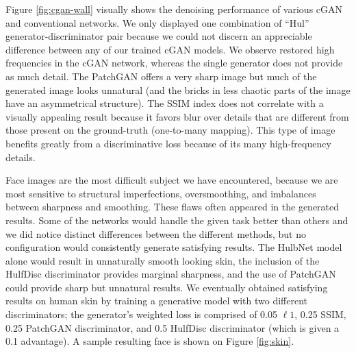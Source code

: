 Figure \ref{fig:cgan-wall} visually shows the denoising performance of various \ac{cGAN} and conventional networks. We only displayed one combination of ``Hul'' generator-discriminator pair because we could not discern an appreciable difference between any of our trained \ac{cGAN} models. We observe restored high frequencies in the \ac{cGAN} network, whereas the single generator does not provide as much detail. The PatchGAN offers a very sharp image but much of the generated image looks unnatural (and the bricks in less chaotic parts of the image have an asymmetrical structure). The SSIM index does not correlate with a visually appealing result because it favors blur over details that are different from those present on the ground-truth (one-to-many mapping). This type of image benefits greatly from a discriminative loss because of its many high-frequency details.

Face images are the most difficult subject we have encountered, because we are most sensitive to structural imperfections, oversmoothing, and imbalances between sharpness and smoothing. These flaws often appeared in the generated results. Some of the networks would handle the given task better than others and we did notice distinct differences between the different methods, but no configuration would consistently generate satisfying results. The HulbNet model alone would result in unnaturally smooth looking skin, the inclusion of the HulfDisc discriminator provides marginal sharpness, and the use of PatchGAN could provide sharp but unnatural results. We eventually obtained satisfying results on human skin by training a generative model with two different discriminators; the generator's weighted loss is comprised of 0.05 $\ell 1$, 0.25 \ac{SSIM}, 0.25 PatchGAN discriminator, and 0.5 HulfDisc discriminator (which is given a 0.1 advantage). A sample resulting face is shown on Figure \ref{fig:skin}.

